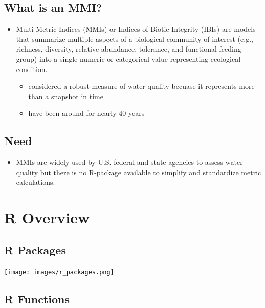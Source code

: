 \documentclass[
]{book}
\providecommand{\tightlist}{%
  \setlength{\itemsep}{0pt}\setlength{\parskip}{0pt}}
\begin{document}
\hypertarget{what-is-an-mmi}{%
\section{What is an MMI?}\label{what-is-an-mmi}}

\begin{itemize}
\tightlist
\item
  Multi-Metric Indices (MMIs) or Indices of Biotic Integrity (IBIs) are models that summarize multiple aspects of a biological community of interest (e.g., richness, diversity, relative abundance, tolerance, and functional feeding group) into a single numeric or categorical value representing ecological condition.

  \begin{itemize}
  \tightlist
  \item
    considered a robust measure of water quality becuase it represents more than a snapshot in time
  \item
    have been around for nearly 40 years
  \end{itemize}
\end{itemize}

\hypertarget{need}{%
\section{Need}\label{need}}

\begin{itemize}
\tightlist
\item
  MMIs are widely used by U.S. federal and state agencies to assess water quality but there is no R-package available to simplify and standardize metric calculations.
\end{itemize}

\hypertarget{r-overview}{%
\chapter{R Overview}\label{r-overview}}

\hypertarget{r-packages}{%
\section{R Packages}\label{r-packages}}

\texttt{[image: images/r\_packages.png]}

\hypertarget{r-functions}{%
\section{R Functions}\label{r-functions}}
\end{document}
